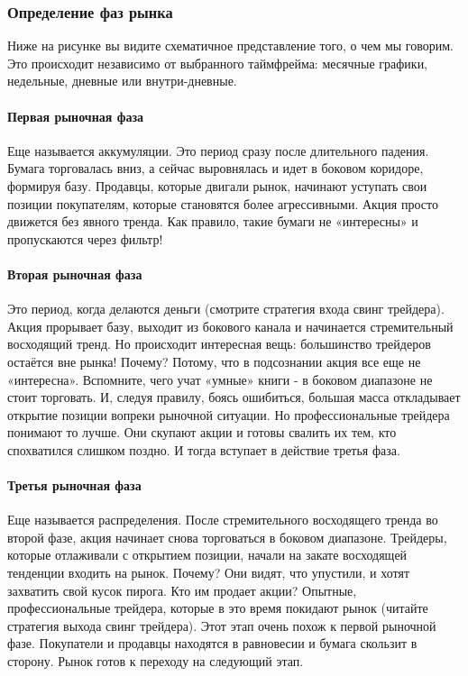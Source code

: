 \documentclass{book}
\begin{document}
\subsubsection{ Определение фаз рынка}

Ниже на рисунке вы видите схематичное представление того, о чем мы говорим. Это происходит независимо от выбранного таймфрейма: месячные графики, недельные, дневные или внутри-дневные.


\paragraph{Первая рыночная фаза}

Еще называется аккумуляции. Это период сразу после длительного
падения. Бумага торговалась вниз, а сейчас выровнялась и идет в
боковом коридоре, формируя базу. Продавцы, которые двигали рынок,
начинают уступать свои позиции покупателям, которые становятся более
агрессивными. Акция просто движется без явного тренда. Как правило,
такие бумаги не «интересны»  и пропускаются через фильтр!

\paragraph{Вторая рыночная фаза}

Это период, когда делаются деньги (смотрите стратегия входа свинг
трейдера). Акция прорывает базу, выходит из бокового канала и
начинается стремительный восходящий тренд. Но происходит интересная
вещь: большинство трейдеров остаётся вне рынка! Почему? Потому, что в
подсознании акция все еще не «интересна». Вспомните, чего учат «умные»
книги -  в боковом диапазоне не стоит торговать. И, следуя правилу,
боясь ошибиться, большая масса откладывает открытие позиции вопреки
рыночной ситуации. Но профессиональные трейдера понимают то лучше. Они
скупают акции и готовы свалить их тем, кто спохватился слишком
поздно. И тогда вступает в действие третья фаза.

\paragraph{Третья рыночная фаза}

Еще называется распределения. После стремительного восходящего тренда
во второй фазе, акция начинает снова торговаться в боковом диапазоне.
Трейдеры, которые отлаживали с открытием позиции, начали на закате
восходящей тенденции входить на рынок. Почему? Они видят, что
упустили, и хотят захватить свой кусок пирога. Кто им продает акции?
Опытные, профессиональные трейдера, которые в это время покидают рынок
(читайте стратегия выхода свинг трейдера). Этот этап очень похож к
первой рыночной фазе. Покупатели и продавцы находятся в равновесии и
бумага скользит в сторону. Рынок готов к переходу на следующий этап.
\end{document}
